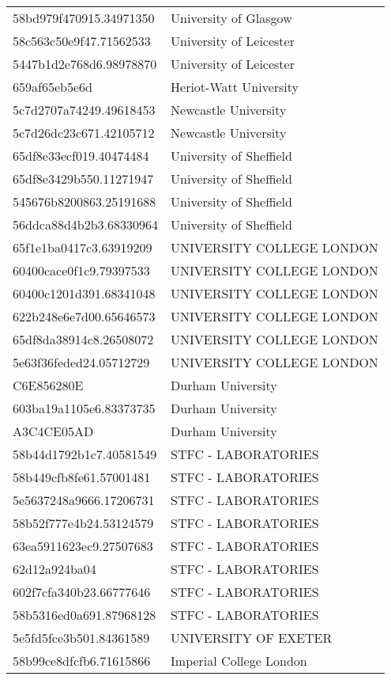 \begin{tabular}{ll}
58bd979f470915.34971350 & University of Glasgow \\
58c563c50e9f47.71562533 & University of Leicester \\
5447b1d2e768d6.98978870 & University of Leicester \\
659af65eb5e6d & Heriot-Watt University \\
5c7d2707a74249.49618453 & Newcastle University \\
5c7d26dc23c671.42105712 & Newcastle University \\
65df8e33ecf019.40474484 & University of Sheffield \\
65df8e3429b550.11271947 & University of Sheffield \\
545676b8200863.25191688 & University of Sheffield \\
56ddca88d4b2b3.68330964 & University of Sheffield \\
65f1e1ba0417c3.63919209 & UNIVERSITY COLLEGE LONDON \\
60400cace0f1c9.79397533 & UNIVERSITY COLLEGE LONDON \\
60400c1201d391.68341048 & UNIVERSITY COLLEGE LONDON \\
622b248e6e7d00.65646573 & UNIVERSITY COLLEGE LONDON \\
65df8da38914c8.26508072 & UNIVERSITY COLLEGE LONDON \\
5e63f36feded24.05712729 & UNIVERSITY COLLEGE LONDON \\
C6E856280E & Durham University \\
603ba19a1105e6.83373735 & Durham University \\
A3C4CE05AD & Durham University \\
58b44d1792b1c7.40581549 & STFC - LABORATORIES \\
58b449cfb8fe61.57001481 & STFC - LABORATORIES \\
5e5637248a9666.17206731 & STFC - LABORATORIES \\
58b52f777e4b24.53124579 & STFC - LABORATORIES \\
63ea5911623ec9.27507683 & STFC - LABORATORIES \\
62d12a924ba04 & STFC - LABORATORIES \\
602f7cfa340b23.66777646 & STFC - LABORATORIES \\
58b5316ed0a691.87968128 & STFC - LABORATORIES \\
5e5fd5fce3b501.84361589 & UNIVERSITY OF EXETER \\
58b99ce8dfcfb6.71615866 & Imperial College London \\

\end{tabular}
